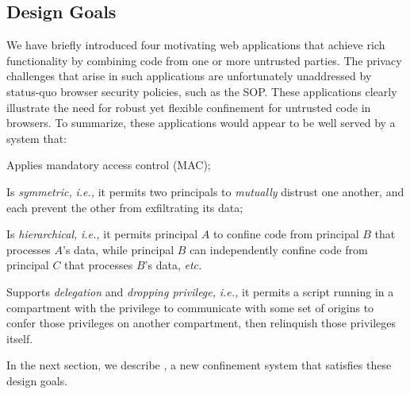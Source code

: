 
\subsection{Design Goals}

We have briefly introduced four motivating web applications that
achieve rich functionality by combining code from one or more
untrusted parties. The privacy challenges that arise in such
applications are unfortunately unaddressed by status-quo browser
security policies, such as the SOP\@. These applications clearly
illustrate the need for robust yet flexible confinement for untrusted
code in browsers. To summarize, these applications would appear to be
well served by a system that:
\begin{CompactItemize}
\item Applies mandatory access control (MAC);
\item Is {\em symmetric,} \emph{i.e.,} it permits two principals to {\em
    mutually} distrust one another, and each prevent the other from
  exfiltrating its data;
\item Is {\em hierarchical, } \emph{i.e.,} it permits principal
  $A$ to confine code from principal $B$ that processes $A$'s data,
  while principal $B$ can independently confine code from principal
  $C$ that processes $B$'s data, \emph{etc.}
\item Supports {\em delegation} and {\em dropping privilege,} \emph{i.e.,} it
  permits a script running in a compartment with the privilege to
  communicate with some set of origins to confer those privileges
  on another compartment, then relinquish those privileges itself.
\end{CompactItemize}
In the next section, we describe \sys{}, a new confinement system that
satisfies these design goals.
